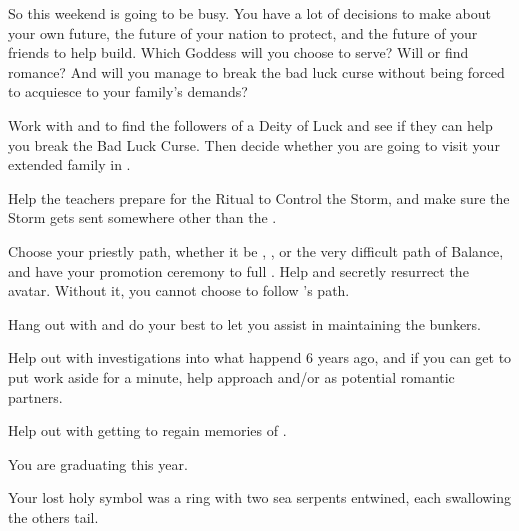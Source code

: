 \documentclass[char]{GL2020}
\begin{document}
So this weekend is going to be busy. You have a lot of decisions to make about your own future, the future of your nation to protect, and the future of your friends to help build. Which Goddess will you choose to serve? Will \cPresident{} or \cChupAvenger{} find romance? And will you manage to break the bad luck curse without being forced to acquiesce to your \pFarm{} family's demands?

\begin{itemz}
	\item Work with \cPresident{} and \cWarlordDaughter{} to find the followers of a Deity of Luck and see if they can help you break the Bad Luck Curse. Then decide whether you are going to visit your extended family in \pFarm{}.
	\item Help the teachers prepare for the Ritual to Control the Storm, and make sure the Storm gets sent somewhere other than the \pShip{}.
	\item Choose your priestly path, whether it be \cEbbFull{\full}, \cFlowFull{\full}, or the very difficult path of Balance, and have your promotion ceremony to full \cInitiate{\cleric}. Help \cFlowPriest{} and \cEbbPriest{} secretly resurrect the \cEbb{} avatar. Without it, you cannot choose to follow \cEbb{}'s path.
	\item Hang out with \cBunker{} and do your best to let you assist \cBunker{\them} in maintaining the bunkers.
	\item Help \cPresident{} out with \cPresident{\their} investigations into what happend 6 years ago, and if you can get \cPresident{\them} to put work aside for a minute, help \cPresident{\them} approach \cHeir{} and/or \cChupStudent{} as potential romantic partners.
	\item Help \cChupAvenger{} out with getting \cHeadScientist{} to regain \cHeadScientist{\their} memories of \cChupAvenger{}.
\end{itemz}

\begin{itemz}[Notes]
	\item You are graduating this year.
	\item Your lost holy symbol was a ring with two sea serpents entwined, each swallowing the others tail.
\end{itemz}
\end{document}
